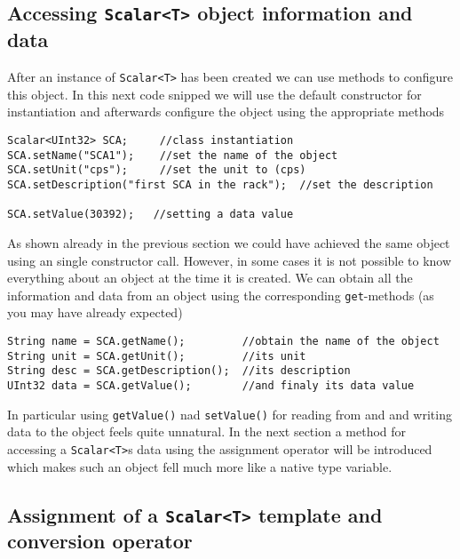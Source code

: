 \subsection{Accessing {\tt Scalar<T>} object information and data}
After an instance of {\tt Scalar<T>} has been created we can use methods 
to configure this object. In this next code snipped we will use 
the default constructor for instantiation and afterwards 
configure the object using the appropriate methods
\begin{verbatim}
Scalar<UInt32> SCA;     //class instantiation
SCA.setName("SCA1");    //set the name of the object
SCA.setUnit("cps");     //set the unit to (cps)
SCA.setDescription("first SCA in the rack");  //set the description

SCA.setValue(30392);   //setting a data value 
\end{verbatim}
As shown already in the previous section we could have achieved the same 
object using an single constructor call. However, in some cases it is 
not possible to know everything about an object at the time it is 
created.
We can obtain all the information and data from an object using the 
corresponding {\tt get}-methods (as you may have already expected)
\begin{verbatim}
String name = SCA.getName();         //obtain the name of the object
String unit = SCA.getUnit();         //its unit
String desc = SCA.getDescription();  //its description
UInt32 data = SCA.getValue();        //and finaly its data value
\end{verbatim}
In particular using {\tt getValue()} nad {\tt setValue()} for reading from
and and writing data to the object feels quite unnatural. In the next section
a method for accessing a {\tt Scalar<T>}s data using the assignment operator 
will be introduced which makes such an object fell much more like a native 
type variable.

\subsection{Assignment of a {\tt Scalar<T>} template and conversion operator}

